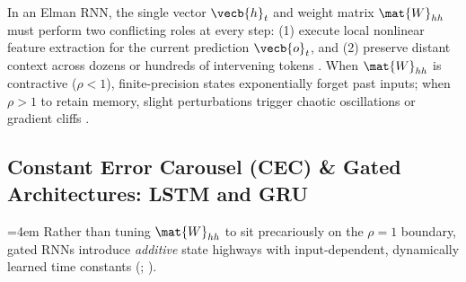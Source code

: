 \documentclass[../../../../master.tex]{subfiles}
\begin{document}
\begin{intuition}
\sloppy
In an Elman RNN, the single vector $\vecb{h}_t$ and weight matrix $\mat{W}_{hh}$ must perform two conflicting roles at every step: (1) execute local nonlinear feature extraction for the current prediction $\vecb{o}_t$, and (2) preserve distant context across dozens or hundreds of intervening tokens . When $\mat{W}_{hh}$ is contractive ($\rho < 1$), finite-precision states exponentially forget past inputs; when $\rho > 1$ to retain memory, slight perturbations trigger chaotic oscillations or gradient cliffs .
\end{intuition}

\subsection{Constant Error Carousel (CEC) \& Gated Architectures: LSTM and GRU}
\label{sec:rnn:lstm_gru}

{\sloppy\emergencystretch=4em
Rather than tuning $\mat{W}_{hh}$ to sit precariously on the $\rho = 1$ boundary, gated RNNs introduce \emph{additive} state highways with input-dependent, dynamically learned time constants (; ).\par}
\end{document}
